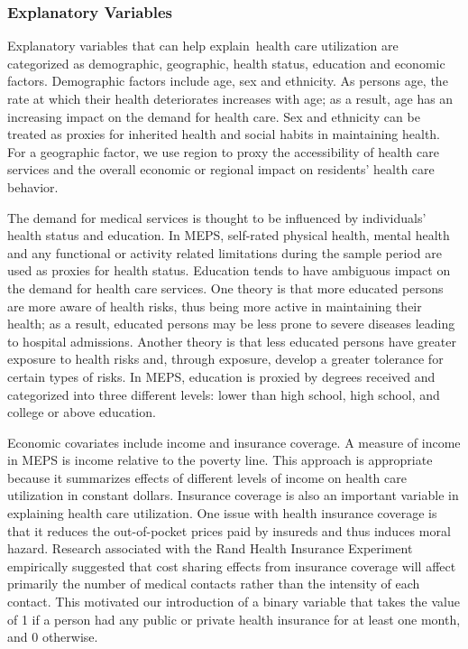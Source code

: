 \subsubsection*{Explanatory Variables}

Explanatory variables that can help explain\ health care utilization are
categorized as demographic, geographic, health status, education and
economic factors. Demographic factors include age, sex and ethnicity. As
persons age, the rate at which their health deteriorates increases with age;
as a result, age has an increasing impact on the demand for health care. Sex
and ethnicity can be treated as proxies for inherited health and social
habits in maintaining health. For a geographic factor, we use region to
proxy the accessibility of health care services and the overall economic or
regional impact on residents' health care behavior.

The demand for medical services is thought to be influenced by individuals'
health status and education. In MEPS, self-rated physical health, mental
health and any functional or activity related limitations during the sample
period are used as proxies for health status. Education tends to have
ambiguous impact on the demand for health care services. One theory is that
more educated persons are more aware of health risks, thus being more active
in maintaining their health; as a result, educated persons may be less prone
to severe diseases leading to hospital admissions. Another theory is that
less educated persons have greater exposure to health risks and, through
exposure, develop a greater tolerance for certain types of risks. In MEPS,
education is proxied by degrees received and categorized into three
different levels: lower than high school, high school, and college or above
education.

Economic covariates include income and insurance coverage. A measure of
income in MEPS is income relative to the poverty line. This approach is
appropriate because it summarizes effects of different levels of income on
health care utilization in constant dollars. Insurance coverage is also an
important variable in explaining health care utilization. One issue with
health insurance coverage is that it reduces the out-of-pocket prices paid
by insureds and thus induces moral hazard. Research associated with the Rand
Health Insurance Experiment empirically suggested that cost sharing effects
from insurance coverage will affect primarily the number of medical contacts
rather than the intensity of each contact. This motivated our introduction
of a binary variable that takes the value of 1 if a person had any public or
private health insurance for at least one month, and 0 otherwise.

